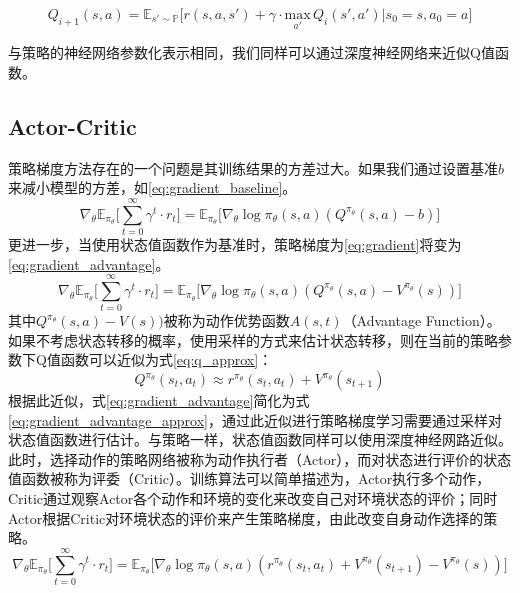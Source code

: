\begin{equation}
  \label{eq:q_learning}
    Q_{i+1}(s, a) = \mathbb{E}_{s' \sim \mathbb{P}}\big[r(s,a,s') + \gamma\cdot \underset{a'}{\mathrm{max}}\,Q_i(s',a') |s_0=s, a_0=a\big]
\end{equation}

与策略的神经网络参数化表示相同，我们同样可以通过深度神经网络来近似Q值函数。

\subsection{Actor-Critic}
策略梯度方法存在的一个问题是其训练结果的方差过大。如果我们通过设置基准$b$来减小模型的方差，如\ref{eq:gradient_baseline}。
\begin{equation}
  \label{eq:gradient_baseline}
    \nabla_{\theta}\mathbb{E}_{\pi_\theta}\bigg[\sum_{t=0}^{\infty} {\gamma^{t}} \cdot r_{t}\bigg]= \mathbb{E}_{\pi_\theta}\big[\nabla_\theta\operatorname{log}\pi_\theta(s,a)(Q^{\pi_\theta}(s,a)-b) \big]
\end{equation}
更进一步，当使用状态值函数作为基准时，策略梯度为\ref{eq:gradient}将变为\ref{eq:gradient_advantage}。
\begin{equation}
  \label{eq:gradient_advantage}
    \nabla_{\theta}\mathbb{E}_{\pi_\theta}\bigg[\sum_{t=0}^{\infty} {\gamma^{t}} \cdot r_{t}\bigg]= \mathbb{E}_{\pi_\theta}\big[\nabla_\theta\operatorname{log}\pi_\theta(s,a)(Q^{\pi_\theta}(s,a)-V^{\pi_\theta}(s)) \big]
\end{equation}
其中$Q^{\pi_\theta}(s,a)-V(s))$被称为动作优势函数$A(s,t)$（Advantage Function）。如果不考虑状态转移的概率，使用采样的方式来估计状态转移，则在当前的策略参数下Q值函数可以近似为式\ref{eq:q_approx}：
\begin{equation}
  \label{eq:q_approx}
   Q^{\pi_\theta}(s_t, a_t) \approx r^{\pi_\theta}(s_t, a_t) + V^{\pi_\theta}(s_{t+1})
\end{equation}
根据此近似，式\ref{eq:gradient_advantage}简化为式\ref{eq:gradient_advantage_approx}，通过此近似进行策略梯度学习需要通过采样对状态值函数进行估计。与策略一样，状态值函数同样可以使用深度神经网路近似。此时，选择动作的策略网络被称为动作执行者（Actor），而对状态进行评价的状态值函数被称为评委（Critic）。训练算法可以简单描述为，Actor执行多个动作，Critic通过观察Actor各个动作和环境的变化来改变自己对环境状态的评价；同时Actor根据Critic对环境状态的评价来产生策略梯度，由此改变自身动作选择的策略。
\begin{equation}
  \label{eq:gradient_advantage_approx}
    \nabla_{\theta}\mathbb{E}_{\pi_\theta}\bigg[\sum_{t=0}^{\infty} {\gamma^{t}} \cdot r_{t}\bigg]= \mathbb{E}_{\pi_\theta}\big[\nabla_\theta\operatorname{log}\pi_\theta(s,a)(r^{\pi_\theta}(s_t, a_t) + V^{\pi_\theta}(s_{t+1})-V^{\pi_\theta}(s)) \big]
\end{equation}

